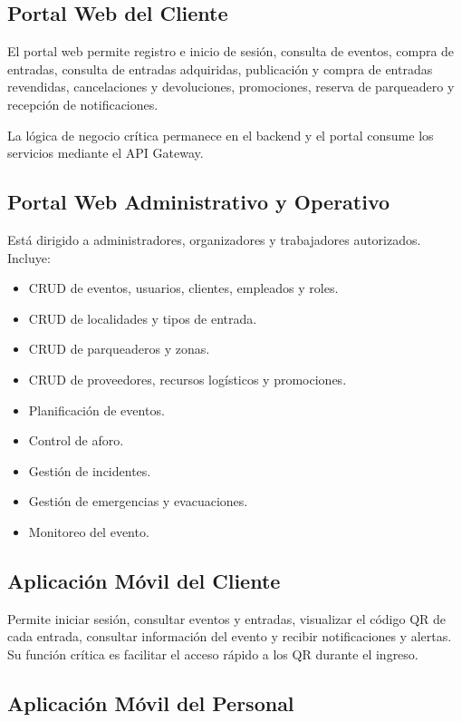 \documentclass[12pt,a4paper]{article}
\begin{document}
\subsection{Portal Web del Cliente}

El portal web permite registro e inicio de sesión, consulta de eventos, compra de entradas, consulta de entradas adquiridas, publicación y compra de entradas revendidas, cancelaciones y devoluciones, promociones, reserva de parqueadero y recepción de notificaciones.

La lógica de negocio crítica permanece en el backend y el portal consume los servicios mediante el API Gateway.

\subsection{Portal Web Administrativo y Operativo}

Está dirigido a administradores, organizadores y trabajadores autorizados. Incluye:

\begin{itemize}
\item CRUD de eventos, usuarios, clientes, empleados y roles.
\item CRUD de localidades y tipos de entrada.
\item CRUD de parqueaderos y zonas.
\item CRUD de proveedores, recursos logísticos y promociones.
\item Planificación de eventos.
\item Control de aforo.
\item Gestión de incidentes.
\item Gestión de emergencias y evacuaciones.
\item Monitoreo del evento.
\end{itemize}

\subsection{Aplicación Móvil del Cliente}

Permite iniciar sesión, consultar eventos y entradas, visualizar el código QR de cada entrada, consultar información del evento y recibir notificaciones y alertas. Su función crítica es facilitar el acceso rápido a los QR durante el ingreso.

\subsection{Aplicación Móvil del Personal}
\end{document}
